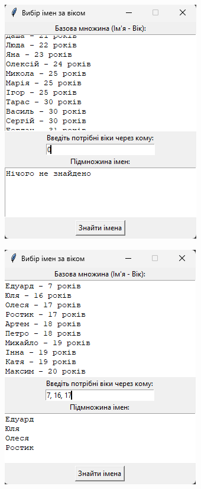 \documentclass[12pt,a4paper]{article}
\begin{document}
\begin{figure}[htbp]
        \begin{subfigure}{0.33\textwidth}
            \includegraphics[width=\linewidth]{ex2.png}
            \label{fig1:c}
        \end{subfigure}
        \begin{subfigure}{0.33\textwidth}
            \includegraphics[width=\linewidth]{ex3.png}

\end{subfigure}
\end{figure}
\end{document}
